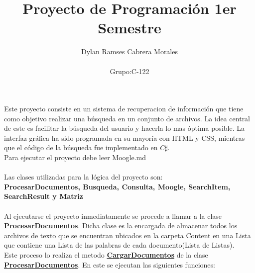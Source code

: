 \documentclass{article}
\begin{document}
\title{Proyecto de Programación 1er Semestre}
\author{Dylan Ramses Cabrera Morales\\ \\
\small{Grupo:C-122}}
\maketitle
Este proyecto consiste en un sistema de recuperacion de información que tiene como objetivo realizar una búsqueda
en un conjunto de archivos. La idea central de este es facilitar la búsqueda del usuario y hacerla
lo mas óptima posible. La interfaz gráfica ha sido programada en su mayoría con HTML y CSS, mientras
que el código de la búsqueda fue implementado en $C\sharp$.\\
Para ejecutar el proyecto debe leer Moogle.md\\ \\
Las clases utilizadas para la lógica del proyecto son:\\
\textbf{ProcesarDocumentos, Busqueda, Consulta, Moogle, SearchItem, SearchResult y Matriz}\\ \\
Al ejecutarse el proyecto inmediatamente se procede a llamar a la clase \textbf{\underline{ProcesarDocumentos}}.
 Dicha clase es la encargada de almacenar todos los archivos de texto que se encuentran ubicados en
 la carpeta Content en una Lista que contiene una Lista de las palabras de cada documento(Lista de Listas).\\
 Este proceso lo realiza el metodo \textbf{\underline{CargarDocumentos}} de la clase \textbf{\underline{ProcesarDocumentos}}.
 En este se ejecutan las siguientes funciones:
\end{document}

